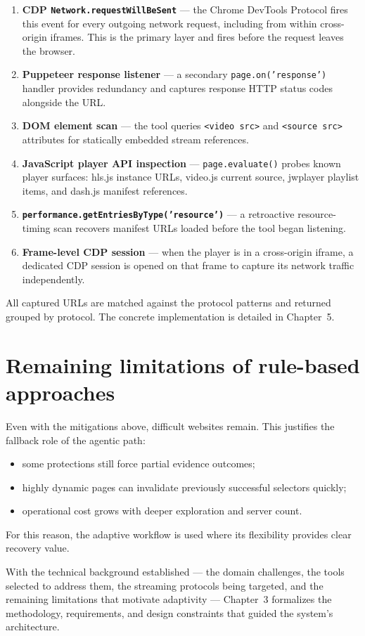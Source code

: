 \begin{enumerate}
  \item \textbf{CDP \texttt{Network.requestWillBeSent}} — the Chrome DevTools Protocol
    fires this event for every outgoing network request, including from within cross-origin
    iframes. This is the primary layer and fires before the request leaves the browser.
  \item \textbf{Puppeteer response listener} — a secondary \texttt{page.on('response')}
    handler provides redundancy and captures response HTTP status codes alongside the URL.
  \item \textbf{DOM element scan} — the tool queries \texttt{<video src>} and
    \texttt{<source src>} attributes for statically embedded stream references.
  \item \textbf{JavaScript player API inspection} — \texttt{page.evaluate()} probes
    known player surfaces: hls.js instance URLs, video.js current source, jwplayer
    playlist items, and dash.js manifest references.
  \item \textbf{\texttt{performance.getEntriesByType('resource')}} — a retroactive
    resource-timing scan recovers manifest URLs loaded before the tool began listening.
  \item \textbf{Frame-level CDP session} — when the player is in a cross-origin iframe,
    a dedicated CDP session is opened on that frame to capture its network traffic
    independently.
\end{enumerate}

All captured URLs are matched against the protocol patterns and returned grouped by
protocol. The concrete implementation is detailed in Chapter~5.

\section{Remaining limitations of rule-based approaches}

Even with the mitigations above, difficult websites remain. This justifies the fallback
role of the agentic path:

\begin{itemize}
  \item some protections still force partial evidence outcomes;
  \item highly dynamic pages can invalidate previously successful selectors quickly;
  \item operational cost grows with deeper exploration and server count.
\end{itemize}

For this reason, the adaptive workflow is used where its flexibility provides clear
recovery value.

With the technical background established — the domain challenges, the tools selected to
address them, the streaming protocols being targeted, and the remaining limitations that
motivate adaptivity — Chapter~3 formalizes the methodology, requirements, and design
constraints that guided the system's architecture.
